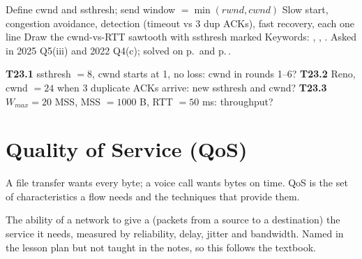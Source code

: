 \begin{answerplan}
 Define cwnd and ssthresh; send window $=\min(rwnd,cwnd)$ \quad {} Slow start, congestion avoidance, detection (timeout vs 3 dup ACKs), fast recovery, each one line \quad
{} Draw the cwnd-vs-RTT sawtooth with ssthresh marked \quad Keywords: , , . Asked in 2025 Q5(iii) and 2022 Q4(c); solved on p.\,\pageref{q:MS2025-5iii} and p.\,\pageref{q:MS2022-4c}.
\par{} \textbf{T23.1} ssthresh $=8$, cwnd starts at 1, no loss: cwnd in rounds 1--6?\quad
\textbf{T23.2} Reno, cwnd $=24$ when 3 duplicate ACKs arrive: new ssthresh and cwnd?\quad
\textbf{T23.3} $W_{max}=20$ MSS, MSS $=1000$ B, RTT $=50$ ms: throughput?
\end{answerplan}

\section{Quality of Service (QoS)}\label{sec:T24}
  

\begin{intuitionbox}
A file transfer wants every byte; a voice call wants bytes on time. QoS is the set of characteristics a flow needs and the techniques that provide them.
\end{intuitionbox}

\begin{definitionbox}
The ability of a network to give a  (packets from a source to a destination) the service it needs, measured by reliability, delay, jitter and bandwidth. Named in the lesson plan but not taught in the notes, so this follows the textbook. 
\end{definitionbox}

